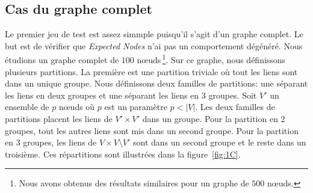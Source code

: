 \subsection{Cas du graphe complet}
\label{Completegraph}
Le premier jeu de test est assez simmple puisqu'il s'agit d'un graphe complet.
Le but est de vérifier que \emph{Expected Nodes} n'ai pas un comportement dégénéré.
Nous étudions un graphe complet de $100$ n\oe uds\,\footnote{Nous avons obtenus des résultats similaires pour un graphe de $500$ n\oe uds.}.
Sur ce graphe, nous définissons plusieurs partitions.
La première est une partition triviale où tout les liens sont dans un unique groupe.
Nous définissons deux familles de partitions: une séparant les liens en deux groupes et une séparant les liens en 3 groupes.
Soit $V'$ un ensemble de $p$ n\oe uds où $p$ est un paramètre $p<|V|$.
Les deux familles de partitions placent les liens de $V' \times V'$ dans un groupe.
Pour la partition en 2 groupes, tout les autres liens sont mis dans un second groupe.
Pour la partition en 3 groupes, les liens de $V \times V\setminus V'$ sont dans un second groupe et le reste dans un troisième.
Ces répartitions sont illustrées dans la figure~\ref{fig:1C}.
%
%


